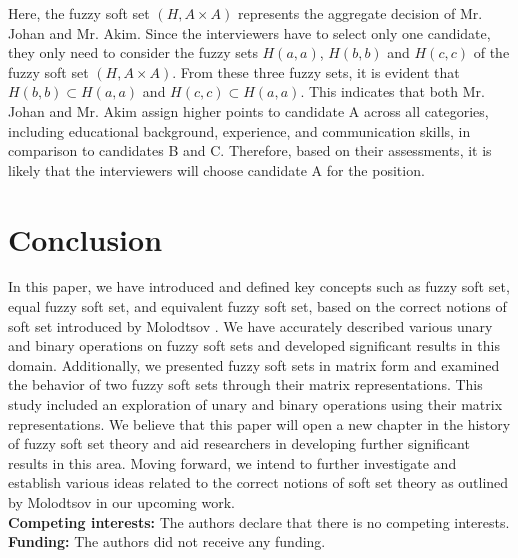 \documentclass{article}
\theoremstyle{definition}
\begin{document}
Here, the fuzzy soft set $(H, A\times A)$ represents the aggregate decision of Mr. Johan and Mr. Akim. Since the interviewers have to select only one candidate, they only need to consider the fuzzy sets $H(a, a)$, $H(b, b)$ and $H(c, c)$ of the fuzzy soft set $(H, A\times A)$. From these three fuzzy sets, it is evident that $H(b, b)\subset H(a, a)$ and $H(c, c)\subset H(a, a)$. This indicates that both Mr. Johan and Mr. Akim assign higher points to candidate A across all categories, including educational background, experience, and communication skills, in comparison to candidates B and C. Therefore, based on their assessments, it is likely that the interviewers will choose candidate A for the position.

\section{Conclusion}

In this paper, we have introduced and defined key concepts such as fuzzy soft set, equal fuzzy soft set, and equivalent fuzzy soft set, based on the correct notions of soft set introduced by Molodtsov \cite{1, 2, 3}. We have accurately described various unary and binary operations on fuzzy soft sets and developed significant results in this domain. Additionally, we presented fuzzy soft sets in matrix form and examined the behavior of two fuzzy soft sets through their matrix representations. This study included an exploration of unary and binary operations using their matrix representations. We believe that this paper will open a new chapter in the history of fuzzy soft set theory and aid researchers in developing further significant results in this area. Moving forward, we intend to further investigate and establish various ideas related to the correct notions of soft set theory as outlined by Molodtsov in our upcoming work.\\


{\bf Competing interests:} The authors declare that there is no competing interests.\\

{\bf Funding:} The authors did not receive any  funding. 
\end{document}

